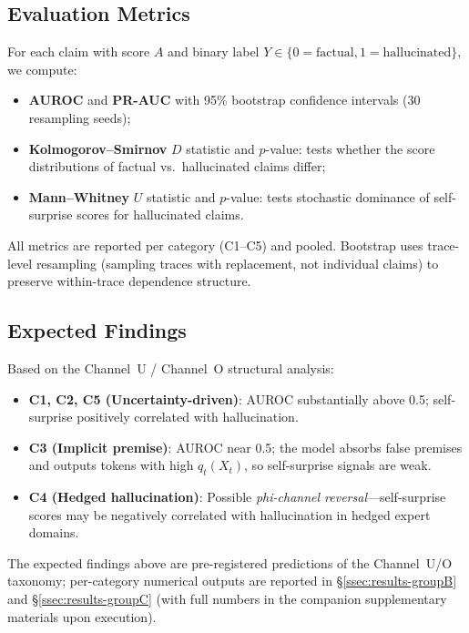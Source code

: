 \documentclass[runningheads]{llncs}
\begin{document}
\subsection{Evaluation Metrics}

For each claim with score $A$ and binary label
$Y \in \{0 = \text{factual}, 1 = \text{hallucinated}\}$, we compute:
\begin{itemize}
    \item \textbf{AUROC} and \textbf{PR-AUC} with 95\% bootstrap confidence
          intervals (30 resampling seeds);
    \item \textbf{Kolmogorov--Smirnov} $D$ statistic and $p$-value: tests
          whether the score distributions of factual vs.\ hallucinated claims
          differ;
    \item \textbf{Mann--Whitney} $U$ statistic and $p$-value: tests stochastic
          dominance of self-surprise scores for hallucinated claims.
\end{itemize}
All metrics are reported per category (C1--C5) and pooled. Bootstrap uses
trace-level resampling (sampling traces with replacement, not individual
claims) to preserve within-trace dependence structure.

\subsection{Expected Findings}

Based on the Channel~U / Channel~O structural analysis:
\begin{itemize}
    \item \textbf{C1, C2, C5 (Uncertainty-driven)}: AUROC substantially above
          0.5; self-surprise positively correlated with hallucination.
    \item \textbf{C3 (Implicit premise)}: AUROC near 0.5; the model absorbs
          false premises and outputs tokens with high $q_t(X_t)$, so
          self-surprise signals are weak.
    \item \textbf{C4 (Hedged hallucination)}: Possible \textit{phi-channel
          reversal}---self-surprise scores may be negatively correlated with
          hallucination in hedged expert domains.
\end{itemize}

The expected findings above are pre-registered predictions of the
Channel~U/O taxonomy; per-category numerical outputs are reported in
\S\ref{ssec:results-groupB} and \S\ref{ssec:results-groupC} (with full
numbers in the companion supplementary materials upon execution).
\end{document}

